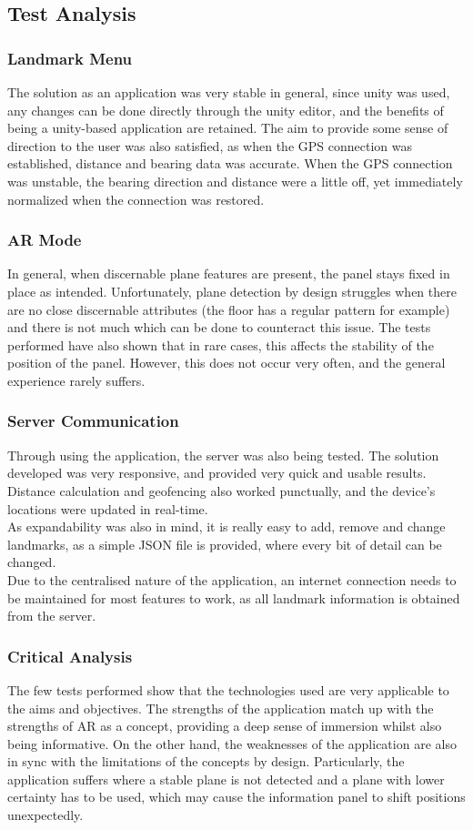 
\subsection{Test Analysis}

\subsubsection{Landmark Menu}
The solution as an application was very stable in general, since unity was used, any changes can be done directly through the unity editor, and the benefits of being a 
unity-based application are retained. The aim to provide some sense of direction to the user was also satisfied, as when the GPS connection was established, distance 
and bearing data was accurate. When the GPS connection was unstable, the bearing direction and distance were a little off, yet immediately normalized when the connection was restored. 
\subsubsection{AR Mode}
In general, when discernable plane features are present, the panel stays fixed in place as intended.
Unfortunately, plane detection by design struggles when there are no close discernable attributes (the floor has a regular pattern for example) and there is not much which can be done to 
counteract this issue. The tests performed have also shown that in rare cases, this affects the stability of the position of the panel. However, this does not occur very often, and the 
general experience rarely suffers.
\subsubsection{Server Communication}
Through using the application, the server was also being tested. The solution developed was very responsive, and provided very quick and usable results. 
Distance calculation and geofencing also worked punctually, and the device's locations were updated in real-time.\\
As expandability was also in mind, it is really easy to add, remove and change landmarks, as a simple JSON file is provided, where every bit of detail can be changed.\\
Due to the centralised nature of the application, an internet connection needs to be maintained for most features to work, 
as all landmark information is obtained from the server.
\subsubsection{Critical Analysis}
The few tests performed show that the technologies used are very applicable to the aims and objectives. The strengths of the application match up with the strengths of AR as a concept, 
providing a deep sense of immersion whilst also being informative. On the other hand, the weaknesses of the application are also in sync with the limitations of the concepts by design. Particularly, the application suffers where a stable 
plane is not detected and a plane with lower certainty has to be used, which may cause the information panel to shift positions unexpectedly. 

